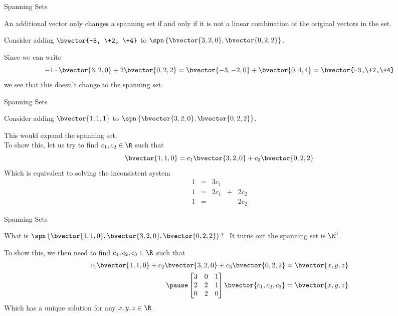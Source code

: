 \documentclass{beamer}
\begin{document}
\begin{frame}{Spanning Sets}
\begin{theorem}
An additional vector only changes a spanning set if and only if it is not a linear combination of the original vectors in the set.
\end{theorem}\pause
\begin{example}
Consider adding $\bvector{-3, \+2, \+4}$ to $\spn\left\{\bvector{3,2,0},\bvector{0,2,2}\right\}$.\pause

Since we can write 
\begin{equation*}
-1\cdot\bvector{3,2,0}+2\bvector{0,2,2}=\bvector{-3,-2,0}+\bvector{0,4,4}=\bvector{-3,\+2,\+4}
\end{equation*}
we see that this doesn't change to the spanning set.
\end{example}
\end{frame}

\begin{frame}{Spanning Sets}
\begin{example}
Consider adding $\bvector{1, 1, 1}$ to $\spn\left\{\bvector{3,2,0},\bvector{0,2,2}\right\}$.\pause

This would expand the spanning set.\\To show this, let us try to find $c_1, c_2\in\R$ such that
\begin{equation*}
\bvector{1,1,0}=c_1\bvector{3,2,0}+c_2\bvector{0,2,2}
\end{equation*}\pause
Which is equivalent to solving the inconsistent system
\begin{equation*}
\begin{aligned}
1 & = & 3c_1 &   &      \\
1 & = & 2c_1 & + & 2c_2 \\
1 & = &      &   & 2c_2
\end{aligned}
\end{equation*}
\end{example}
\end{frame}

\begin{frame}{Spanning Sets}
\begin{example}
What is $\spn\left\{\bvector{1,1,0},\bvector{3,2,0},\bvector{0,2,2}\right\}$?\ \pause
It turns out the spanning set is $\R^3$.\pause

To show this, we then need to find $c_1, c_2, c_3\in\R$ such that 
\begin{equation*}
\begin{aligned}
c_1\bvector{1,1,0}+c_2\bvector{3,2,0}+c_3\bvector{0,2,2} &= \bvector{x,y,z} \\\pause
\begin{bmatrix}
3 & 0 & 1 \\
2 & 2 & 1 \\
0 & 2 & 0 \\
\end{bmatrix}
\bvector{c_1,c_2,c_3}&=\bvector{x,y,z}
\end{aligned}
\end{equation*}\pause
Which has a unique solution for any $x,y,z\in\R$.
\end{example}
\end{frame}
\end{document}
